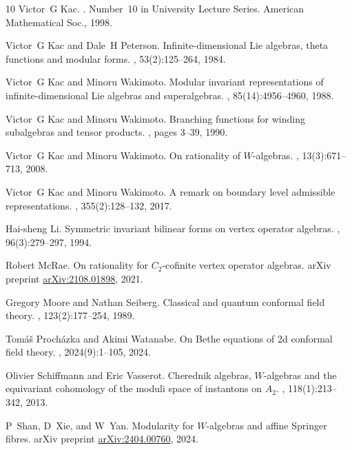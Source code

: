 \documentclass[12pt]{amsart}
\theoremstyle{plain}
\theoremstyle{definition}
\numberwithin{equation}{section}
\begin{document}
\begin{thebibliography}{10}
Victor~G Kac.
.
\newblock Number~10 in University Lecture Series. American Mathematical Soc.,
  1998.

Victor~G Kac and Dale~H Peterson.
\newblock Infinite-dimensional {L}ie algebras, theta functions and modular
  forms.
, 53(2):125--264, 1984.

Victor~G Kac and Minoru Wakimoto.
\newblock Modular invariant representations of infinite-dimensional {L}ie
  algebras and superalgebras.
,
  85(14):4956--4960, 1988.

Victor~G Kac and Minoru Wakimoto.
\newblock Branching functions for winding subalgebras and tensor products.
, pages 3--39, 1990.

Victor~G Kac and Minoru Wakimoto.
\newblock On rationality of {$W$}-algebras.
, 13(3):671--713, 2008.

Victor~G Kac and Minoru Wakimoto.
\newblock A remark on boundary level admissible representations.
, 355(2):128--132, 2017.

Hai-sheng Li.
\newblock Symmetric invariant bilinear forms on vertex operator algebras.
, 96(3):279--297, 1994.

Robert McRae.
\newblock On rationality for {$C_2$}-cofinite vertex operator algebras.
\newblock arXiv preprint \url{arXiv:2108.01898}, 2021.

Gregory Moore and Nathan Seiberg.
\newblock Classical and quantum conformal field theory.
, 123(2):177--254, 1989.

Tom{\'a}{\v{s}} Proch{\'a}zka and Akimi Watanabe.
\newblock On {B}ethe equations of 2d conformal field theory.
, 2024(9):1--105, 2024.

Olivier Schiffmann and Eric Vasserot.
\newblock Cherednik algebras, {$W$}-algebras and the equivariant cohomology of
  the moduli space of instantons on {$A_2$}.
, 118(1):213--342,
  2013.

P~Shan, D~Xie, and W~Yan.
\newblock Modularity for {$W$}-algebras and affine {S}pringer fibres.
\newblock arXiv preprint \url{arXiv:2404.00760}, 2024.


\end{thebibliography}
\end{document}
